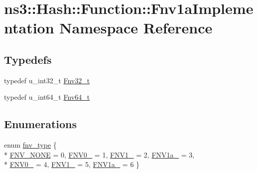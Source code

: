 \hypertarget{namespacens3_1_1Hash_1_1Function_1_1Fnv1aImplementation}{}\section{ns3\+:\+:Hash\+:\+:Function\+:\+:Fnv1a\+Implementation Namespace Reference}
\label{namespacens3_1_1Hash_1_1Function_1_1Fnv1aImplementation}
\subsection*{Typedefs}
\begin{DoxyCompactItemize}
\item 
typedef u\+\_\+int32\+\_\+t \hyperlink{group__hash__fnv_ga6de33672f4d12dba1c58d1b9ff210d65}{Fnv32\+\_\+t}
\item 
typedef u\+\_\+int64\+\_\+t \hyperlink{group__hash__fnv_ga4b6673bffbef8355685a9e0129b86e16}{Fnv64\+\_\+t}
\end{DoxyCompactItemize}
\subsection*{Enumerations}
\begin{DoxyCompactItemize}
\item 
enum \hyperlink{group__hash__fnv_gade4dc6882f24a5ecd6b9d41e6698b275}{fnv\+\_\+type} \{ \\*
\hyperlink{group__hash__fnv_ggade4dc6882f24a5ecd6b9d41e6698b275a9ddf1e553238aab7e8c19411f88be262}{F\+N\+V\+\_\+\+N\+O\+NE} = 0, 
\hyperlink{group__hash__fnv_ggade4dc6882f24a5ecd6b9d41e6698b275ae43fe5fd2bea5e0a1a4f34144f7acb84}{F\+N\+V0\+\_} = 1, 
\hyperlink{group__hash__fnv_ggade4dc6882f24a5ecd6b9d41e6698b275af56bb58f654f4ad17f9e84e7118021a9}{F\+N\+V1\+\_} = 2, 
\hyperlink{group__hash__fnv_ggade4dc6882f24a5ecd6b9d41e6698b275a0cf8d0725ff84c31470b8041737e17ca}{F\+N\+V1a\+\_} = 3, 
\\*
\hyperlink{group__hash__fnv_ggade4dc6882f24a5ecd6b9d41e6698b275ab97f50ad95fcf2a4f11c77079e4cfeee}{F\+N\+V0\+\_} = 4, 
\hyperlink{group__hash__fnv_ggade4dc6882f24a5ecd6b9d41e6698b275a5eb69234449bf051b23d003555325bde}{F\+N\+V1\+\_} = 5, 
\hyperlink{group__hash__fnv_ggade4dc6882f24a5ecd6b9d41e6698b275a97b127307500c011595ba0cbf56903b5}{F\+N\+V1a\+\_} = 6
 \}
\end{DoxyCompactItemize}
